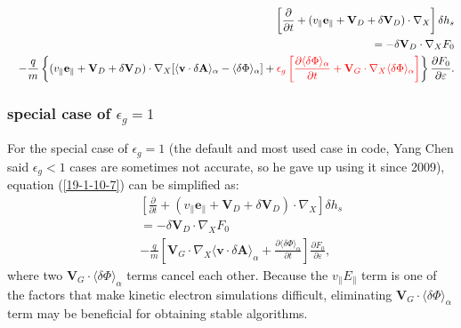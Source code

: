 \documentclass{article}
\newcommand{\tmcolor}[2]{{\color{#1}{#2}}}
\newcommand{\tmtexttt}[1]{\text{{\ttfamily{#1}}}}
\begin{document}
\begin{eqnarray}
  &  & \left[ \frac{\partial}{\partial t} + (v_{\parallel}
  \mathbf{e}_{\parallel} +\mathbf{V}_D + \delta \mathbf{V}_D) \cdot \nabla_X
  \right] \delta h_s \nonumber\\
  &  & = - \delta \mathbf{V}_D \cdot \nabla_X F_0 \nonumber\\
  &  & - \frac{q}{m} \left\{ (v_{\parallel} \mathbf{e}_{\parallel}
  +\mathbf{V}_D + \delta \mathbf{V}_D) \cdot \nabla_X [\langle \mathbf{v}
  \cdot \delta \mathbf{A} \rangle_{\alpha} - \langle \delta \Phi
  \rangle_{\alpha}] + \tmcolor{red}{\epsilon_g \left[ \frac{\partial \langle
  \delta \Phi \rangle_{\alpha}}{\partial t} +\mathbf{V}_G \cdot \nabla_X
  \langle \delta \Phi \rangle_{\alpha} \right]} \right\} \frac{\partial
  F_0}{\partial \varepsilon} .  \label{19-1-10-7}
\end{eqnarray}


\subsubsection{special case of $\epsilon_g = 1$}

For the special case of $\epsilon_g = 1$ (the default and most used case in
\tmtexttt{GEM} code, Yang Chen said $\epsilon_g < 1$ cases are sometimes not
accurate, so he gave up using it since 2009), equation (\ref{19-1-10-7}) can
be simplified as:
\begin{eqnarray}
  &  & \left[ \frac{\partial}{\partial t} + (v_{\parallel}
  \mathbf{e}_{\parallel} +\mathbf{V}_D + \delta \mathbf{V}_D) \cdot \nabla_X
  \right] \delta h_s \nonumber\\
  &  & = - \delta \mathbf{V}_D \cdot \nabla_X F_0 \nonumber\\
  &  & - \frac{q}{m} \left[ \mathbf{V}_G \cdot \nabla_X \langle \mathbf{v}
  \cdot \delta \mathbf{A} \rangle_{\alpha} + \frac{\partial \langle \delta
  \Phi \rangle_{\alpha}}{\partial t} \right] \frac{\partial F_0}{\partial
  \varepsilon},  \label{19-1-10-7m2}
\end{eqnarray}
where two $\mathbf{V}_G \cdot \langle \delta \Phi \rangle_{\alpha}$ terms
cancel each other. Because the $v_{\parallel} E_{\parallel}$ term is one of
the factors that make kinetic electron simulations difficult, eliminating
$\mathbf{V}_G \cdot \langle \delta \Phi \rangle_{\alpha}$ term may be
beneficial for obtaining stable algorithms.
\end{document}
